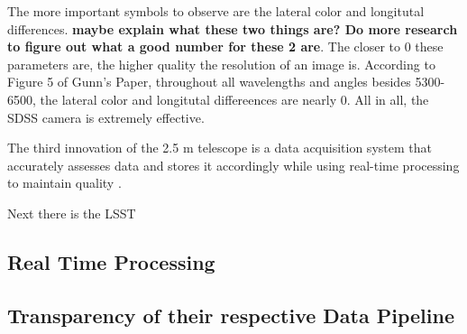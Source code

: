 \documentclass[preprint,linenumbers, longauthor]{aastex631}
\begin{document}
The more important symbols to observe are the lateral color and longitutal differences. \textbf{maybe explain what these two things are? Do more research to figure out what a good number for these 2 are}. 
The closer to 0 these parameters are, the higher quality the resolution of an image is. According to Figure 5 of Gunn's Paper, throughout all wavelengths and angles besides 5300-6500, the lateral color and longitutal differeences are nearly 0.
All in all, the SDSS camera is extremely effective.

The third innovation of the 2.5 m telescope is a data acquisition system that accurately assesses data and stores it accordingly while using real-time processing to maintain quality \cite{gunn25TelescopeSloan2006}.






Next there is the LSST
\subsection{Real Time Processing}

\subsection{Transparency of their respective Data Pipeline}

\end{document}
